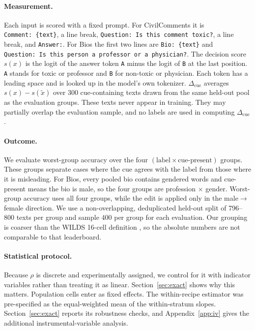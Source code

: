 \documentclass[11pt]{article}
\newcommand{\cued}{\ensuremath{\Delta_{\mathrm{cue}}}}
\begin{document}
\paragraph{Measurement.}
Each input is scored with a fixed prompt. For CivilComments it is
\texttt{Comment:\ \{text\}}, a line break, \texttt{Question:\ Is this comment
toxic?}, a line break, and \texttt{Answer:}. For Bios the first two lines are
\texttt{Bio:\ \{text\}} and \texttt{Question:\ Is this person a professor or a
physician?}. The decision score $s(x)$ is the logit of the answer token \texttt{A} minus the
logit of \texttt{B} at the last position. \texttt{A} stands for toxic or
professor and \texttt{B} for non-toxic or physician. Each token has a leading
space and is looked up in the model's own tokenizer. \cued{} averages
$s(x)-s(\tilde{x})$ over 300 cue-containing texts drawn from the same held-out
pool as the evaluation groups. These texts never appear in training. They may
partially overlap the evaluation sample, and no labels are used in computing
\cued{}.

\paragraph{Outcome.}
We evaluate worst-group accuracy over the four
$(\text{label} \times \text{cue-present})$ groups. These groups separate cases
where the cue agrees with the label from those where it is misleading. For
Bios, every pooled bio contains gendered words and cue-present means the bio
is male, so the four groups are profession $\times$ gender. Worst-group
accuracy uses all four groups, while the edit is applied only in the
male$\rightarrow$female direction. We use a non-overlapping, deduplicated held-out split of 796--800 texts per group and
sample 400 per group for each evaluation. Our grouping is coarser than the
WILDS 16-cell definition \citep{koh2021wilds}, so the absolute numbers are not
comparable to that leaderboard.

\paragraph{Statistical protocol.}
Because $\rho$ is discrete and experimentally assigned, we control for it with
indicator variables rather than treating it as linear. Section~\ref{sec:exact}
shows why this matters. Population cells enter as fixed effects. The
within-recipe estimator was pre-specified as the equal-weighted mean of the
within-stratum slopes. Section~\ref{sec:exact} reports its robustness checks,
and Appendix~\ref{app:iv} gives the additional instrumental-variable analysis.
\end{document}
